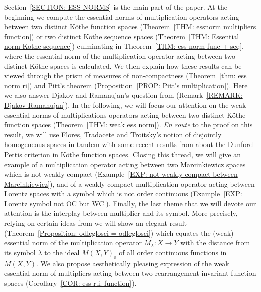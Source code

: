 \documentclass[11pt]{amsart}
\theoremstyle{definition}
\theoremstyle{definition}
\theoremstyle{definition}
\theoremstyle{definition}
\theoremstyle{definition}
\theoremstyle{definition}
\theoremstyle{definition}
\theoremstyle{definition}
\numberwithin{equation}{section}
\numberwithin{equation}{section}
\numberwithin{equation}{section}
\theoremstyle{definition}
\theoremstyle{definition}
\theoremstyle{definition}
\theoremstyle{definition}
\theoremstyle{definition}
\theoremstyle{definition}
\begin{document}
Section~\ref{SECTION: ESS NORMS} is the main part of the paper.
At the beginning we compute the essential norms of multiplication operators acting between two distinct K{\" o}the function spaces
(Theorem~\ref{THM: essnorm multipliers function}) or two distinct K{\" o}the sequence spaces (Theorem~\ref{THM: Essential norm Kothe sequence})
culminating in Theorem~\ref{THM: ess norm func + seq}, where the essential norm of the multiplication operator acting between two
distinct K{\" o}the spaces is calculated.
We then explain how these results can be viewed through the prism of measures of non-compactness (Theorem~\ref{thm: ess norm ri})
and Pitt's theorem (Proposition~\ref{PROP: Pitt's multiplication}).
Here we also answer Djakov and Ramanujan's question from \cite{DR00} (Remark~\ref{REMARK: Djakov-Ramanujan}).
In the following, we will focus our attention on the weak essential norms of multiplications operators acting between two distinct K{\" o}the
function spaces (Theorem~\ref{THM: weak ess norm}). {\it En route} to the proof on this result, we will use Flores, Tradacete and Troitsky's
notion of disjointly homogeneous spaces in tandem with some recent results from \cite{LTM22} about the Dunford--Pettis criterion in K{\" o}the
function spaces. Closing this thread, we will give an example of a multiplication operator acting between two Marcinkiewicz spaces which
is not weakly compact (Example~\ref{EXP: not weakly compact between Marcinkiewicz}), and of a weakly compact multiplication operator
acting between Lorentz spaces with a symbol which is not order continuous (Example~\ref{EXP: Lorentz symbol not OC but WC}).
Finally, the last theme that we will devote our attention is the interplay between multiplier and its symbol.
More precisely, relying on certain ideas from \cite{KKT22} we will show an elegant result (Theorem~\ref{Proposition: odleglosci = odleglosci})
which equates the (weak) essential norm of the multiplication operator $M_{\lambda} \colon X \rightarrow Y$ with the distance from its symbol
$\lambda$ to the ideal $M(X,Y)_o$ of all order continuous functions in $M(X,Y)$.
We also propose aesthetically pleasing expression of the weak essential norm of multipliers acting between two rearrangement invariant function
spaces (Corollary~\ref{COR: ess r.i. function}).
\end{document}
